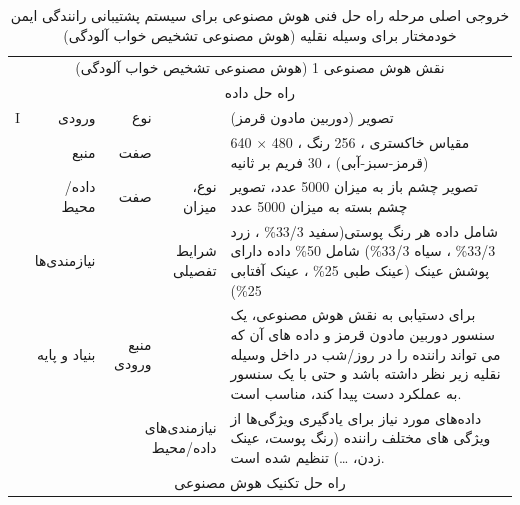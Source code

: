 \documentclass[a4paper,10pt]{article}
\begin{document}
    \begin{table}[htbp]

        \centering
        \caption{خروجی اصلی مرحله راه حل فنی هوش مصنوعی برای سیستم پشتیبانی رانندگی ایمن خودمختار برای وسیله نقلیه (هوش مصنوعی تشخیص خواب آلودگی)}
        \begin{tabularx}{\textwidth}{c c c c X}

            \vspace{-10pt}\\

            \hline

            \multicolumn{5}{c}{نقش هوش مصنوعی 1 (هوش مصنوعی تشخیص خواب آلودگی)}\\
            
            \hline

            \multicolumn{5}{c}{راه حل داده}\\

            \multicolumn{1}{c}{I} & \multicolumn{1}{r}{ورودی} & \multicolumn{1}{r}{نوع} &  & تصویر (دوربین مادون قرمز) \\
            & \multicolumn{1}{r}{منبع} & \multicolumn{1}{r}{صفت} &  & 640 $\times$ 480 ، مقیاس خاکستری ، 256 رنگ (قرمز-سبز-آبی) ، 30 فریم بر ثانیه \\
            & \multicolumn{1}{r}{داده/محیط} & \multicolumn{1}{r}{صفت} & \multicolumn{1}{r}{نوع، میزان} & تصویر چشم باز به میزان 5000 عدد، تصویر چشم بسته به میزان 5000 عدد \\
            & \multicolumn{1}{r}{نیازمندی‌ها} &  & \multicolumn{1}{r}{شرایط تفصیلی} & شامل داده هر رنگ پوستی(سفید 33/3\% ، زرد 33/3\% ، سیاه 33/3\%) شامل 50\% داده دارای پوشش عینک (عینک طبی 25\% ، عینک آفتابی 25\%) \\
            & \multicolumn{1}{r}{بنیاد و پایه} & \multicolumn{1}{r}{منبع ورودی} &  & برای دستیابی به نقش هوش مصنوعی، یک سنسور دوربین مادون قرمز و داده های آن که می تواند راننده را در روز/شب در داخل وسیله نقلیه زیر نظر داشته باشد و حتی با یک سنسور به عملکرد دست پیدا کند، مناسب است. \\
            &  & \multicolumn{2}{r}{نیازمندی‌های داده/محیط} & داده‌های مورد نیاز برای یادگیری ویژگی‌ها از ویژگی های مختلف راننده (رنگ پوست، عینک زدن، \dots) تنظیم شده است. \\

            \multicolumn{5}{c}{راه حل تکنیک هوش مصنوعی}\\


\end{tabularx}
\end{table}
\end{document}
